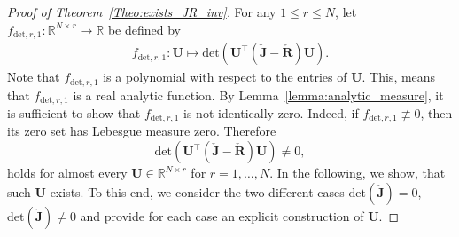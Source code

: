 \documentclass{article}
\newcommand{\bmU}{\bm{U}}
\newcommand{\bmJ}{\bm{J}}
\newcommand{\bmR}{\bm{R}}
\newcommand{\R}{\mathbb{R}}
\newcommand{\FOMsize}{N}
\newcommand{\ROMsize}{r}
\newcommand{\Jcheck}{\check{\bmJ}}
\newcommand{\Rcheck}{\check{\bmR}}
\begin{document}
\begin{proof}[Proof of Theorem~\ref{Theo:exists_JR_inv}]
			For any $1\le\ROMsize\leq \FOMsize$, let $f_{\mathrm{det},\ROMsize,1}\colon\R^{\FOMsize\times\ROMsize}\rightarrow \R$ be defined by 
			\begin{align*}
				f_{\mathrm{det},\ROMsize,1}\colon\bmU\mapsto \allowbreak \mathrm{det}\left(\bmU^{\top}\left(\Jcheck-\Rcheck\right)\bmU\right).
			\end{align*}
			Note that $f_{\mathrm{det},\ROMsize,1}$ is a polynomial with respect to the entries of $\bmU$. This, means that $f_{\mathrm{det},\ROMsize,1}$ is a real analytic function.
			By Lemma~\ref{lemma:analytic_measure}, it is sufficient to show that $f_{\mathrm{det},\ROMsize,1}$ is not identically zero. Indeed, if $f_{\mathrm{det},\ROMsize,1} \not\equiv 0$, then its zero set has Lebesgue measure zero. Therefore 
			\begin{equation*}
				\mathrm{det}\left(\bmU^{\top}\left(\Jcheck-\Rcheck\right)\bmU\right)\neq 0,
			\end{equation*}
			holds for almost every $ \bmU\in\R^{\FOMsize\times \ROMsize} $ for $\ROMsize=1,\ldots,\FOMsize$. 
			In the following, we show, that such $\bmU$ exists. To this end, we consider the two different cases $\mathrm{det}(\Jcheck)=0$, $\mathrm{det}(\Jcheck)\neq0$ and provide for each case an explicit construction of $\bmU$. 
			

\end{proof}
\end{document}
